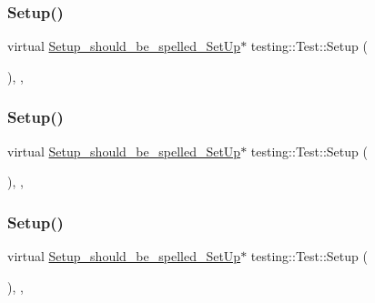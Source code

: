 \mbox{\label{classtesting_1_1_test_a65c1626d50b7dd1a1d759dc6c3f72d4c}} 
\subsubsection{\texorpdfstring{Setup()}{Setup()}\hspace{0.1cm}{\footnotesize\ttfamily [1/3]}}
{\footnotesize\ttfamily virtual \mbox{\hyperlink{structtesting_1_1_test_1_1_setup__should__be__spelled___set_up}{Setup\+\_\+should\+\_\+be\+\_\+spelled\+\_\+\+Set\+Up}}$\ast$ testing\+::\+Test\+::\+Setup (\begin{DoxyParamCaption}{ }\end{DoxyParamCaption})\hspace{0.3cm}{\ttfamily [inline]}, {\ttfamily [private]}, {\ttfamily [virtual]}}

\mbox{\label{classtesting_1_1_test_a65c1626d50b7dd1a1d759dc6c3f72d4c}} 
\subsubsection{\texorpdfstring{Setup()}{Setup()}\hspace{0.1cm}{\footnotesize\ttfamily [2/3]}}
{\footnotesize\ttfamily virtual \mbox{\hyperlink{structtesting_1_1_test_1_1_setup__should__be__spelled___set_up}{Setup\+\_\+should\+\_\+be\+\_\+spelled\+\_\+\+Set\+Up}}$\ast$ testing\+::\+Test\+::\+Setup (\begin{DoxyParamCaption}{ }\end{DoxyParamCaption})\hspace{0.3cm}{\ttfamily [inline]}, {\ttfamily [private]}, {\ttfamily [virtual]}}

\mbox{\label{classtesting_1_1_test_a65c1626d50b7dd1a1d759dc6c3f72d4c}} 
\subsubsection{\texorpdfstring{Setup()}{Setup()}\hspace{0.1cm}{\footnotesize\ttfamily [3/3]}}
{\footnotesize\ttfamily virtual \mbox{\hyperlink{structtesting_1_1_test_1_1_setup__should__be__spelled___set_up}{Setup\+\_\+should\+\_\+be\+\_\+spelled\+\_\+\+Set\+Up}}$\ast$ testing\+::\+Test\+::\+Setup (\begin{DoxyParamCaption}{ }\end{DoxyParamCaption})\hspace{0.3cm}{\ttfamily [inline]}, {\ttfamily [private]}, {\ttfamily [virtual]}}

